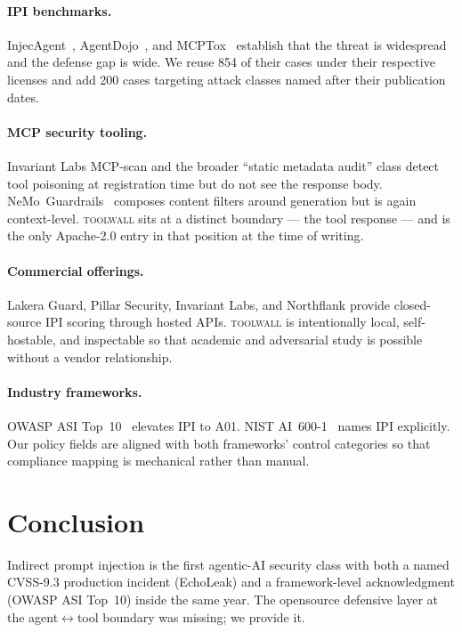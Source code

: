 \paragraph{IPI benchmarks.}
InjecAgent~\cite{zhan2024injecagent},
AgentDojo~\cite{debenedetti2024agentdojo}, and
MCPTox~\cite{mcptox2025} establish that the threat is widespread
and the defense gap is wide. We reuse 854 of their cases under
their respective licenses and add 200 cases targeting attack
classes named after their publication dates.

\paragraph{MCP security tooling.} Invariant Labs MCP-scan and the
broader ``static metadata audit'' class detect tool poisoning at
registration time but do not see the response body.
NeMo~Guardrails~\cite{nemoguard2024} composes content filters
around generation but is again context-level. \textsc{toolwall}
sits at a distinct boundary --- the tool response --- and is the
only Apache-2.0 entry in that position at the time of writing.

\paragraph{Commercial offerings.} Lakera Guard, Pillar Security,
Invariant Labs, and Northflank provide closed-source IPI scoring
through hosted APIs. \textsc{toolwall} is intentionally local,
self-hostable, and inspectable so that academic and adversarial
study is possible without a vendor relationship.

\paragraph{Industry frameworks.}
OWASP ASI Top~10~\cite{owaspasi2026} elevates IPI to A01. NIST
AI~600-1~\cite{nist60012024} names IPI explicitly. Our policy
fields are aligned with both frameworks' control categories so
that compliance mapping is mechanical rather than manual.

\section{Conclusion}
\label{sec:conclusion}

Indirect prompt injection is the first agentic-AI security class
with both a named CVSS-9.3 production incident (EchoLeak) and a
framework-level acknowledgment (OWASP ASI Top~10) inside the same
year. The opensource defensive layer at the agent$\leftrightarrow$tool
boundary was missing; we provide it.

